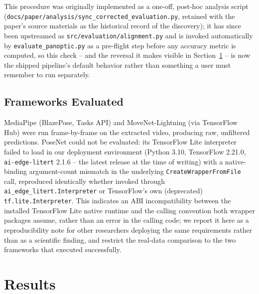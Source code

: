 \documentclass[conference]{IEEEtran}
\begin{document}
This procedure was originally implemented as a one-off, post-hoc analysis
script (\texttt{docs/paper/analysis/sync\_corrected\_evaluation.py},
retained with the paper's source materials as the historical record of
the discovery); it has since been upstreamed as
\texttt{src/evaluation/alignment.py} and is invoked automatically by
\texttt{evaluate\_panoptic.py} as a pre-flight step before any accuracy
metric is computed, so this check -- and the reversal it makes visible in
Section~\ref{sec:results} -- is now the shipped pipeline's default
behavior rather than something a user must remember to run separately.

\subsection{Frameworks Evaluated}
MediaPipe (BlazePose, Tasks API) and MoveNet-Lightning (via TensorFlow
Hub) were run frame-by-frame on the extracted video, producing raw,
unfiltered predictions. PoseNet could not be evaluated: its TensorFlow
Lite interpreter failed to load in our deployment environment (Python
3.10, TensorFlow 2.21.0, \texttt{ai-edge-litert} 2.1.6 -- the latest
release at the time of writing) with a native-binding argument-count
mismatch in the underlying \texttt{CreateWrapperFromFile} call, reproduced
identically whether invoked through \texttt{ai\_edge\_litert.Interpreter}
or TensorFlow's own (deprecated) \texttt{tf.lite.Interpreter}. This
indicates an ABI incompatibility between the installed TensorFlow Lite
native runtime and the calling convention both wrapper packages assume,
rather than an error in the calling code; we report it here as a
reproducibility note for other researchers deploying the same
requirements rather than as a scientific finding, and restrict the real-data
comparison to the two frameworks that executed successfully.

\section{Results}
\label{sec:results}
\end{document}
